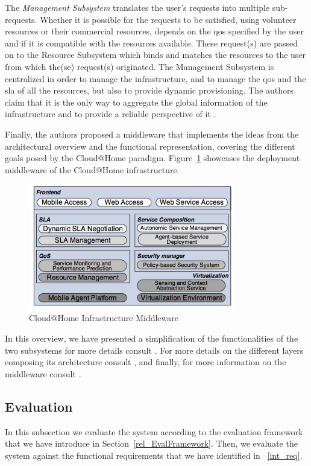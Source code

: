\documentclass[12pt, titlepage]{uo_temp}
\begin{document}
     The \emph{Management Subsystem} translates the user's requests into multiple
     sub-requests. Whether it is possible for the requests to be satisfied, using
     volunteer resources or their commercial resources, depends on the \gls{qos} specified
     by the user and if it is compatible with the resources available. These request(s)
     are passed on to the Resource Subsystem which binds and matches the resources to the
     user from which the(se) request(s) originated. The Management Subsystem is
     centralized in order to manage the infrastructure, and to manage the \gls{qos} and
     the \gls{sla} of all the resources, but also to provide dynamic provisioning. The
     authors claim that it is the only way to aggregate the global information of the
     infrastructure and to provide a reliable perspective of it \cite{cunsolo2010open}.

     Finally, the authors proposed a middleware that implements the ideas from the
     architectural overview and the functional representation, covering the different
     goals posed by the Cloud@Home paradigm. Figure~\ref{cathome_infra} showcases the
     deployment middleware of the Cloud@Home infrastructure.

     \begin{figure}[h]
       \centering
       \includegraphics[width=90mm]{images/cathome_infra.jpg}
       \caption{Cloud@Home Infrastructure Middleware\label{cathome_infra} \cite{aversa2011cloud}}
     \end{figure}

     In this overview, we have presented a simplification of the functionalities of the
     two subsystems for more details consult \cite{cunsolo2010open}. For more details on
     the different layers composing its architecture consult \cite{aversa2011cloud}, and
     finally, for more information on the middleware consult \cite{cunsolo2010applying}.

     \subsection{Evaluation}
     In this subsection we evaluate the system according to the evaluation framework that
     we have introduce in Section~\ref{rel_EvalFramework}. Then, we evaluate the system
     against the functional requirements that we have identified in ~\ref{int_req}.
\end{document}
